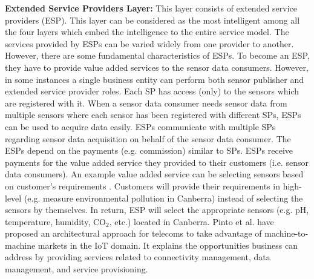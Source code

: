 \documentclass[conference]{IEEEtran}
\begin{document}
\textbf{Extended Service Providers Layer:} This layer consists of extended service providers (ESP). This layer can be considered as the most intelligent among all the four layers which embed the intelligence to the entire service model. The services provided by ESPs can be varied widely from one provider to another. However, there are some fundamental characteristics of ESPs. To become an ESP, they have to provide value added services to the sensor data consumers. However, in some instances a single business entity can perform both sensor publisher and extended service provider roles. Each SP has access (only) to the sensors which are registered with it. When a sensor data consumer needs sensor data from multiple sensors where each sensor has been registered with different SPs, ESPs can be used to acquire data easily. ESPs communicate with multiple SPs regarding sensor data acquisition on behalf of the sensor data consumer. The ESPs depend on the payments (e.g. commission) similar to SPs. ESPs receive payments for the value added service they provided to their customers (i.e. sensor data consumers). An example value added service can be selecting sensors based on customer's requirements \cite{ZMP004}. Customers will provide their requirements in high-level (e.g. measure environmental pollution in Canberra) instead of selecting the sensors by themselves. In return, ESP will select the appropriate sensors (e.g. pH, temperature, humidity, CO$_{2}$, etc.) located in Canberra. Pinto et al. \cite{P666} have proposed  an architectural approach for telecoms to take advantage of machine-to-machine markets in the IoT domain. It explains the opportunities  business can address by providing services related to connectivity management, data management, and service provisioning.
\end{document}

